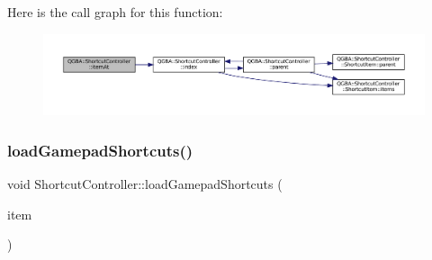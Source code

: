 Here is the call graph for this function\+:
\nopagebreak
\begin{figure}[H]
\begin{center}
\leavevmode
\includegraphics[width=350pt]{class_q_g_b_a_1_1_shortcut_controller_aaa91a06146dda9ceb44d744901ba7b92_cgraph}
\end{center}
\end{figure}
\mbox{\label{class_q_g_b_a_1_1_shortcut_controller_af130660b45ff1e2f2e676098201f3fa1}} 
\subsubsection{\texorpdfstring{load\+Gamepad\+Shortcuts()}{loadGamepadShortcuts()}}
{\footnotesize\ttfamily void Shortcut\+Controller\+::load\+Gamepad\+Shortcuts (\begin{DoxyParamCaption}\item[{\mbox{\hyperlink{class_q_g_b_a_1_1_shortcut_controller_1_1_shortcut_item}{Shortcut\+Item}} $\ast$}]{item }\end{DoxyParamCaption})\hspace{0.3cm}{\ttfamily [private]}}

